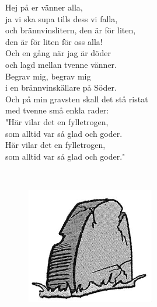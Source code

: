 \documentclass[a6paper, 10pt, twoside]{article}
\begin{document}
\begin{center}
\end{center}
\begin{lyrics}
Hej på er vänner alla, \\
ja vi ska supa tills dess vi falla, \\
och brännvinslitern, den är för liten, \\
den är för liten för oss alla! \\
\newline
Och en gång när jag är döder\\ 
och lagd mellan tvenne vänner. \\
Begrav mig, begrav mig \\
i en brännvinskällare på Söder. \\
\newline
Och på min gravsten skall det stå ristat \\
med tvenne små enkla rader: \\
"Här vilar det en fylletrogen, \\
som alltid var så glad och goder.\\ 
Här vilar det en fylletrogen, \\
som alltid var så glad och goder." 
\end{lyrics}
\vspace{35pt} \\
\begin{figure}[!h]
\centering
\includegraphics[width=0.5\textwidth]{gravsten.jpg}
\end{figure}
\end{document}
